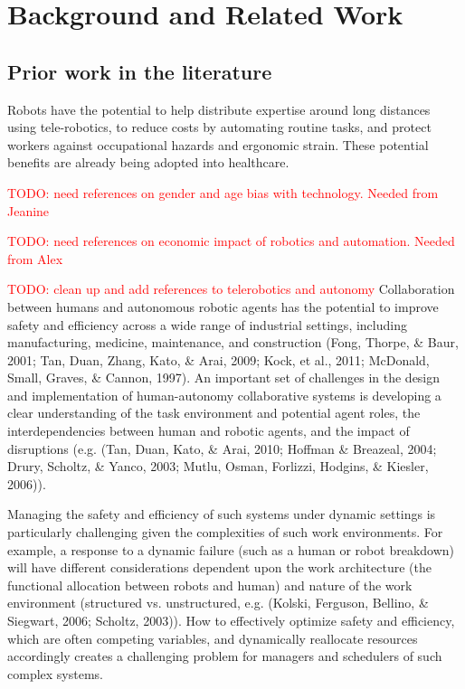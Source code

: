 \section{Background and Related Work}

\subsection{Prior work in the literature}
Robots have the potential to help distribute expertise around long distances using tele-robotics, to reduce costs by automating routine tasks, and protect workers against occupational hazards and ergonomic strain.  These potential benefits are already being adopted into healthcare.

\textcolor{red}{TODO: need references on gender and age bias with technology.  Needed from Jeanine}

\textcolor{red}{TODO: need references on economic impact of robotics and automation.  Needed from Alex}

\textcolor{red}{TODO: clean up and add references to telerobotics and autonomy}
Collaboration between humans and autonomous robotic agents has the potential to improve safety and efficiency across a wide range of industrial settings, including manufacturing, medicine, maintenance, and construction (Fong, Thorpe, \& Baur, 2001; Tan, Duan, Zhang, Kato, \& Arai, 2009; Kock, et al., 2011; McDonald, Small, Graves, \& Cannon, 1997). An important set of challenges in the design and implementation of human-autonomy collaborative systems is developing a clear understanding of the task environment and potential agent roles, the interdependencies between human and robotic agents, and the impact of disruptions (e.g. (Tan, Duan, Kato, \& Arai, 2010; Hoffman \& Breazeal, 2004; Drury, Scholtz, \& Yanco, 2003; Mutlu, Osman, Forlizzi, Hodgins, \& Kiesler, 2006)).

Managing the safety and efficiency of such systems under dynamic settings is particularly challenging given the complexities of such work environments. For example, a response to a dynamic failure (such as a human or robot breakdown) will have different considerations dependent upon the work architecture (the functional allocation between robots and human) and nature of the work environment (structured vs. unstructured, e.g. (Kolski, Ferguson, Bellino, \& Siegwart, 2006; Scholtz, 2003)). How to effectively optimize safety and efficiency, which are often competing variables, and dynamically reallocate resources accordingly creates a challenging problem for managers and schedulers of such complex systems.

